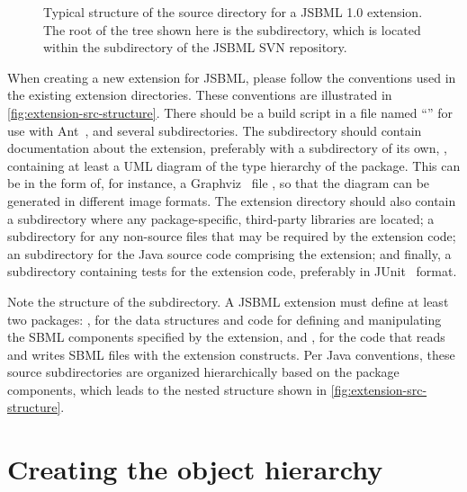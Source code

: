 \begin{wrapfigure}[22]{r}{2.07in}
  \vspace*{-3.5ex}
  \caption{Typical structure of the source directory for a JSBML 1.0 extension.
    The root of the tree shown here is the  subdirectory,
    which is located within the  subdirectory of the JSBML SVN
    repository.}
  \label{fig:extension-src-structure}
\end{wrapfigure}
When creating a new extension for JSBML, please follow the conventions used
in the existing extension directories.  These conventions are illustrated in
\vref{fig:extension-src-structure}.  There should be a build script in a file
named ``'' for use with Ant~\citep{ApacheAnt}, and several
subdirectories.  The  subdirectory should contain documentation
about the extension, preferably with a subdirectory of its own, ,
containing at least a UML diagram of the type hierarchy of the package.  This
can be in the form of, for instance, a Graphviz~\cite{graphvizWebsite} file
, so that the diagram can be generated in different
image formats.  The extension directory should also contain a 
subdirectory where any package-specific, third-party libraries are located; a
 subdirectory for any non-source files that may be required
by the extension code; an  subdirectory for the Java source code
comprising the extension; and finally, a  subdirectory containing
tests for the extension code, preferably in JUnit~\cite{junitWebsite}
format.

Note the structure of the  subdirectory. A JSBML extension must
define at least two packages: , for the
data structures and code for defining and manipulating the SBML components
specified by the extension, and , for the
code that reads and writes SBML files with the extension
constructs.  Per Java conventions, these source subdirectories are
organized hierarchically based on the package components, which leads to
the nested structure shown in \vref{fig:extension-src-structure}.


\section{Creating the object hierarchy}
\label{sec:creating-obj-hierarchy}

